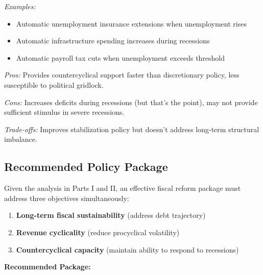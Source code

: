 \documentclass[12pt,letterpaper]{article}
\begin{document}
\textit{Examples:}
\begin{itemize}
    \item Automatic unemployment insurance extensions when unemployment rises
    \item Automatic infrastructure spending increases during recessions
    \item Automatic payroll tax cuts when unemployment exceeds threshold
\end{itemize}

\textit{Pros:} Provides countercyclical support faster than discretionary policy, less susceptible to political gridlock.

\textit{Cons:} Increases deficits during recessions (but that's the point), may not provide sufficient stimulus in severe recessions.

\textit{Trade-offs:} Improves stabilization policy but doesn't address long-term structural imbalance.

\subsection{Recommended Policy Package}

Given the analysis in Parts I and II, an effective fiscal reform package must address three objectives simultaneously:

\begin{enumerate}
    \item \textbf{Long-term fiscal sustainability} (address debt trajectory)
    \item \textbf{Revenue cyclicality} (reduce procyclical volatility)
    \item \textbf{Countercyclical capacity} (maintain ability to respond to recessions)
\end{enumerate}

\textbf{Recommended Package:}
\end{document}
